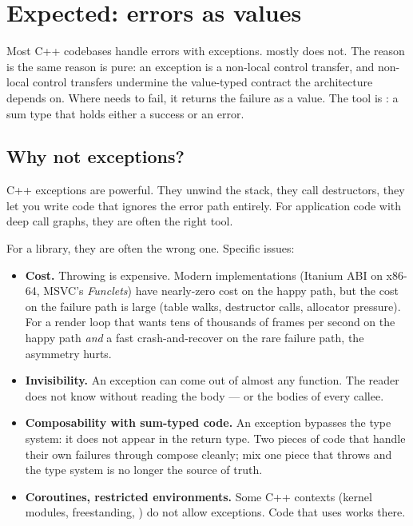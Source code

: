 \chapter{Expected: errors as values}
\label{ch:expected}

\begin{aside}
Most C++ codebases handle errors with exceptions. \maya{} mostly
does not. The reason is the same reason  is pure: an
exception is a non-local control transfer, and non-local control
transfers undermine the value-typed contract the architecture
depends on. Where \maya{} needs to fail, it returns the failure
as a value. The tool is : a sum type
that holds either a success or an error.
\end{aside}

\section{Why not exceptions?}

C++ exceptions are powerful. They unwind the stack, they call
destructors, they let you write code that ignores the error path
entirely. For application code with deep call graphs, they are
often the right tool.

For a library, they are often the wrong one. Specific issues:

\begin{itemize}[leftmargin=*]
  \item \textbf{Cost.} Throwing is expensive. Modern
    implementations (Itanium ABI on x86-64, MSVC's
    \emph{Funclets}) have nearly-zero cost on the happy path,
    but the cost on the failure path is large (table walks,
    destructor calls, allocator pressure). For a render loop
    that wants tens of thousands of frames per second on the
    happy path \emph{and} a fast crash-and-recover on the rare
    failure path, the asymmetry hurts.
  \item \textbf{Invisibility.} An exception can come out of
    almost any function. The reader does not know without
    reading the body --- or the bodies of every callee.
  \item \textbf{Composability with sum-typed code.} An exception
    bypasses the type system: it does not appear in the return
    type. Two pieces of code that handle their own failures
    through  compose cleanly; mix one piece that
    throws and the type system is no longer the source of truth.
  \item \textbf{Coroutines, restricted environments.} Some C++
    contexts (kernel modules, freestanding, )
    do not allow exceptions. Code that uses 
    works there.
\end{itemize}

